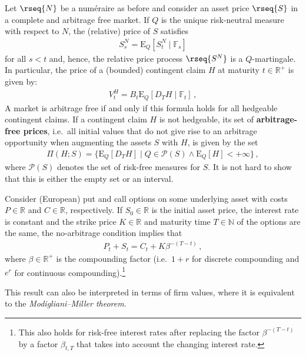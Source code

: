     \begin{property}
        Let $\rseq{N}$ be a num\'eraire as before and consider an asset price $\rseq{S}$ in a complete and arbitrage free market. If $Q$ is the unique risk-neutral measure with respect to $N$, the (relative) price of $S$ satisfies
        \begin{gather}
            S_s^N = \mathrm{E}_Q[S_t^N\mid\mathbb{F}_s]
        \end{gather}
        for all $s<t$ and, hence, the relative price process $\rseq{S^N}$ is a $Q$-martingale. In particular, the price of a (bounded) contingent claim $H$ at maturity $t\in\mathbb{R}^+$ is given by:
        \begin{gather}
            V_t^H = B_t\mathrm{E}_Q[D_TH\mid\mathbb{F}_t]\,,
        \end{gather}
        A market is arbitrage free if and only if this formula holds for all hedgeable contingent claims. If a contingent claim $H$ is not hedgeable, its set of \textbf{arbitrage-free prices}, i.e.~all initial values that do not give rise to an arbitrage opportunity when augmenting the assets $S$ with $H$, is given by the set
        \begin{gather}
            \Pi(H;S) = \{\mathrm{E}_Q[D_TH]\mid Q\in\mathcal{P}(S)\land \mathrm{E}_Q[H]<+\infty\}\,,
        \end{gather}
        where $\mathcal{P}(S)$ denotes the set of risk-free measures for $S$. It is not hard to show that this is either the empty set or an interval.
    \end{property}

    \begin{result}
        Consider (European) put and call options on some underlying asset with costs $P\in\mathbb{R}$ and $C\in\mathbb{R}$, respectively. If $S_0\in\mathbb{R}$ is the initial asset price, the interest rate is constant and the strike price $K\in\mathbb{R}$ and maturity time $T\in\mathbb{N}$ of the options are the same, the no-arbitrage condition implies that
        \begin{gather}
            P_t+S_t = C_t + K\beta^{-(T-t)}\,,
        \end{gather}
        where $\beta\in\mathbb{R}^+$ is the compounding factor (i.e.~$1+r$ for discrete compounding and $e^r$ for continuous compounding).\footnote{This also holds for risk-free interest rates after replacing the factor $\beta^{-(T-t)}$ by a factor $\beta_{t,T}$ that takes into account the changing interest rate.}
    \end{result}
    \begin{remark}
        This result can also be interpreted in terms of firm values, where it is equivalent to the \textit{Modigliani--Miller theorem}.
    \end{remark}

